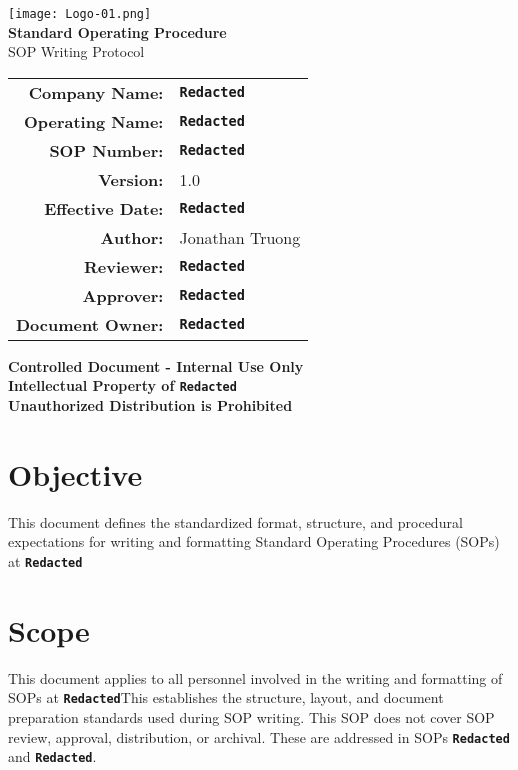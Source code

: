 \documentclass[11pt]{article}
\newcommand{\CompanyName}{\textbf{\texttt{Redacted}}}
\newcommand{\BrandName}{\textbf{\texttt{Redacted}}}
\newcommand{\DocumentID}{\textbf{\texttt{Redacted}}}
\newcommand{\EffectiveDate}{\textbf{\texttt{Redacted}}}
\newcommand{\Author}{Jonathan Truong}
\newcommand{\Reviewer}{\textbf{\texttt{Redacted}}}
\newcommand{\Approver}{\textbf{\texttt{Redacted}}}
\newcommand{\DocumentOwner}{\textbf{\texttt{Redacted}}}
\newcommand{\SOPTitle}{SOP Writing Protocol}
\newcommand{\CoverTitleFont}{\fontsize{22}{24}\selectfont\bfseries}
\newcommand{\CoverSubTitleFont}{\fontsize{18}{30}\selectfont}
\begin{document}
\thispagestyle{empty}
\begin{center}
    \texttt{[image: Logo-01.png]} \\
    \vspace{2cm}
    {\CoverTitleFont Standard Operating Procedure}\\ [0.25 cm]
    {\CoverSubTitleFont \SOPTitle}\\[0.25 cm]
    \vspace{2cm}
    \begin{center}
    \begin{tabular}{rl}
    \textbf{Company Name:} & \CompanyName\\
    \textbf{Operating Name:} & \BrandName \\
    \textbf{SOP Number:} & \DocumentID \\
    \textbf{Version:} & 1.0 \\
    \textbf{Effective Date:} & \EffectiveDate \\
    \textbf{Author:} & \Author \\
    \textbf{Reviewer:} & \Reviewer \\
    \textbf{Approver:} & \Approver \\
    \textbf{Document Owner:} & \DocumentOwner \\
    \end{tabular}
    \end{center}
    \vspace{2cm}
    {\textbf{Controlled Document - Internal Use Only}}\\[0.1 cm]
    {\textbf{Intellectual Property of \CompanyName}}\\[0.1 cm]
    {\textbf{Unauthorized Distribution is Prohibited}}\\
\end{center}


\newpage
{}
\setcounter{page}{1}

\section{Objective}
    This document defines the standardized format, structure, and procedural expectations for writing and formatting Standard Operating Procedures (SOPs) at \CompanyName

\section{Scope}
    This document applies to all personnel involved in the writing and formatting of SOPs at \CompanyName \space This establishes the structure, layout, and document preparation standards used during SOP writing. This SOP does not cover SOP review, approval, distribution, or archival. These are addressed in SOPs {\textbf{\texttt{Redacted}}} and {\textbf{\texttt{Redacted}}}.
\end{document}

